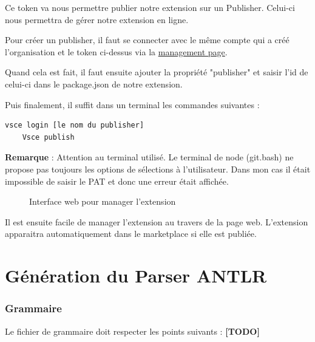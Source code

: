 \documentclass[
    iict, %
    il, %
]{heig-tb}
\begin{document}
Ce token va nous permettre publier notre extension sur un Publisher. Celui-ci nous permettra de gérer notre extension en ligne.

Pour créer un publisher, il faut se connecter avec le même compte qui a créé l'organisation et le token ci-dessus via la \href{https://marketplace.visualstudio.com/manage/publishers/}{management page}.

Quand cela est fait, il faut ensuite ajouter la propriété "publisher" et saisir l'id de celui-ci dans le package.json de notre extension.

Puis finalement, il suffit dans un terminal les commandes suivantes :
\begin{lstlisting}[frame=single]
    vsce login [le nom du publisher]
    Vsce publish
\end{lstlisting}

\textbf{Remarque} : Attention au terminal utilisé. Le terminal de node (git.bash) ne propose pas toujours les options de sélections à l'utilisateur. Dans mon cas il était impossible de saisir le PAT et donc une erreur était affichée.

\begin{figure}[!h]
    \begin{center}
    \end{center}
    \caption[Interface web pour manager l'extension]{\label{manage-publisher} Interface web pour manager l'extension}
\end{figure}

Il est ensuite facile de manager l'extension au travers de la page web.
L'extension apparaitra automatiquement dans le marketplace si elle est publiée.


\section{Génération du Parser ANTLR}
\subsubsection{Grammaire}
Le fichier de grammaire doit respecter les points suivants : \textbf{[TODO]}
\end{document}
